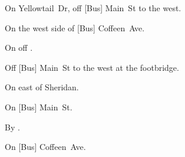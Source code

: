 
\begin{LocationList}

On Yellowtail~Dr, off [Bus] Main~St to the west.

On the west side of [Bus] Coffeen~Ave.

On  off  .

Off [Bus] Main~St to the west at the footbridge.

\Location{\RecruitmentAgency \Recruitment}
On  east of Sheridan.

On [Bus] Main~St.

\Location{\TruckStop \Gas \Rest}
By  .

On [Bus] Coffeen~Ave.

\end{LocationList}

